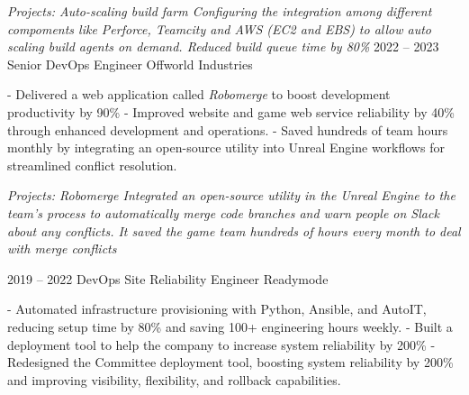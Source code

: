 \documentclass[9pt]{developercv} %
\begin{document}
\begin{entrylist}
{            \textit{Projects: Auto-scaling build farm\newline
            Configuring the integration among different compoments like Perforce, Teamcity and AWS (EC2 and EBS) to allow 
            auto scaling build agents on demand. Reduced build queue time by 80\%\newline}
        }
	\entry
		{2022 -- 2023}
		{Senior DevOps Engineer}
		{Offworld Industries}
		{
            - Delivered a web application called \textit{Robomerge} to boost development productivity by 90\%\newline
            - Improved website and game web service reliability by 40\% through enhanced development and operations.\newline
            - Saved hundreds of team hours monthly by integrating an open-source utility into Unreal Engine workflows for streamlined conflict resolution.\newline

            \textit{Projects: Robomerge\newline
            Integrated an open-source utility in the Unreal Engine to the team’s process to automatically merge code branches and warn people on Slack about any conflicts. It saved the game team hundreds of hours every month to deal with merge conflicts\newline}
        }
    \entry
		{2019 -- 2022}
		{DevOps Site Reliability Engineer}
		{Readymode}
		{
            - Automated infrastructure provisioning with Python, Ansible, and AutoIT, reducing setup time by 80\% and saving 100+ engineering hours weekly.\newline
            - Built a deployment tool to help the company to increase system reliability by 200\%\newline
            - Redesigned the Committee deployment tool, boosting system reliability by 200\% and improving visibility, flexibility, and rollback capabilities.\newline

}
\end{entrylist}
\end{document}
